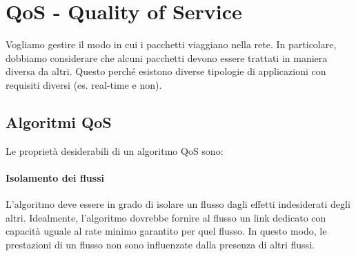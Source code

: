 \documentclass{article}
\begin{document}
\newpage
\section{QoS - Quality of Service}
Vogliamo gestire il modo in cui i pacchetti viaggiano nella rete. In particolare, dobbiamo considerare che alcuni pacchetti devono essere trattati in maniera diversa da altri. Questo perché esistono diverse tipologie di applicazioni con requisiti diversi (es. real-time e non).

\subsection{Algoritmi QoS}
Le proprietà desiderabili di un algoritmo QoS sono:
\paragraph{Isolamento dei flussi} L'algoritmo deve essere in grado di isolare un flusso dagli effetti indesiderati degli altri. Idealmente, l'algoritmo dovrebbe fornire al flusso un link dedicato con capacità uguale al rate minimo garantito per quel flusso. In questo modo, le prestazioni di un flusso non sono influenzate dalla presenza di altri flussi.\\
\end{document}
